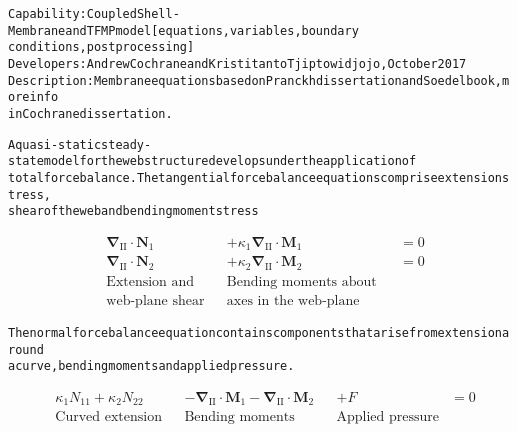 \documentclass{article}
\begin{document}
\begin{alltt}
Capability: Coupled Shell-Membrane and TFMP model [equations, variables, boundary
conditions, post processing]
Developers: Andrew Cochrane and Kristitanto Tjiptowidjojo, October 2017
Description: Membrane equations based on Pranckh dissertation and Soedel book, more info
in Cochrane dissertation.

A quasi-static steady-state model for the web structure develops under the application of
total force balance. The tangential force balance equations comprise extension stress,
shear of the web and bending moment stress
\end{alltt}
\begin{subequations}
\begin{align*}
&\boldsymbol{\nabla}_\mathrm{II} \cdot \boldsymbol{N}_1& & + \kappa_1  \boldsymbol{\nabla}_\mathrm{II} \cdot \boldsymbol{M}_1& &= 0\\
&\boldsymbol{\nabla}_\mathrm{II} \cdot \boldsymbol{N}_2& & + \kappa_2  \boldsymbol{\nabla}_\mathrm{II} \cdot \boldsymbol{M}_2& &= 0\\
&\text{Extension and}&     &\text{Bending moments about}& \nonumber&\\
&\text{web-plane shear}&   &\text{axes in the web-plane}& \nonumber&
\end{align*}
\end{subequations}
\begin{alltt}
The normal force balance equation contains components that arise from extension around
a curve, bending moments and applied pressure.
\end{alltt}
\begin{align*}
&\kappa_1 N_{11} + \kappa_2 N_{22}&  & - \boldsymbol{\nabla}_\mathrm{II} \cdot \boldsymbol{M}_1 - \boldsymbol{\nabla}_\mathrm{II} \cdot \boldsymbol{M}_2&  &+ F& = 0 \label{eq:3dshell_normal_balance}\\
&\text{Curved extension}&         &\text{Bending moments}&                                                                                              &\text{Applied pressure}& \nonumber
\end{align*}
\end{document}
